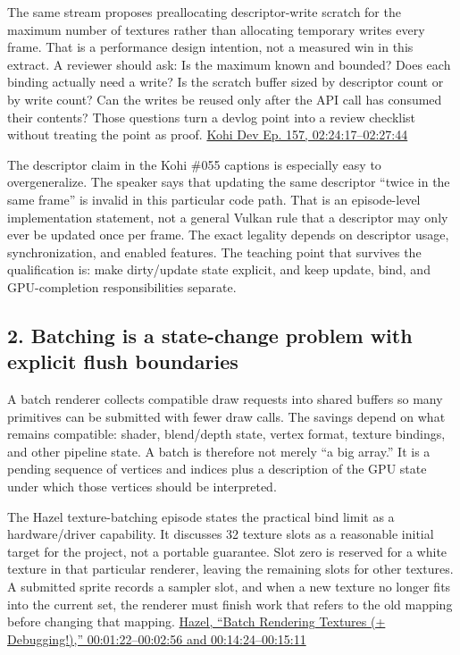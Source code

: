 The same stream proposes preallocating descriptor-write scratch for the maximum number of textures rather than allocating temporary writes every frame. That is a performance design intention, not a measured win in this extract. A reviewer should ask: Is the maximum known and bounded? Does each binding actually need a write? Is the scratch buffer sized by descriptor count or by write count? Can the writes be reused only after the API call has consumed their contents? Those questions turn a devlog point into a review checklist without treating the point as proof. \href{https://www.youtube.com/watch?v=ZmZUmsqUN6Q&t=2h24m17s}{Kohi Dev Ep. 157, 02:24:17--02:27:44}

The descriptor claim in the Kohi \#055 captions is especially easy to overgeneralize. The speaker says that updating the same descriptor ``twice in the same frame'' is invalid in this particular code path. That is an episode-level implementation statement, not a general Vulkan rule that a descriptor may only ever be updated once per frame. The exact legality depends on descriptor usage, synchronization, and enabled features. The teaching point that survives the qualification is: make dirty/update state explicit, and keep update, bind, and GPU-completion responsibilities separate.

\subsection{2. Batching is a state-change problem with explicit flush boundaries}\label{06-engine-ii-ch041-batching-is-a-state-change-problem-with-explicit-flush-boundaries}

\hypertarget{06-engine-ii-ch041-batching-is-a-state-change-problem-with-explicit-flush-boundaries}{}

A batch renderer collects compatible draw requests into shared buffers so many primitives can be submitted with fewer draw calls. The savings depend on what remains compatible: shader, blend/depth state, vertex format, texture bindings, and other pipeline state. A batch is therefore not merely ``a big array.'' It is a pending sequence of vertices and indices plus a description of the GPU state under which those vertices should be interpreted.

The Hazel texture-batching episode states the practical bind limit as a hardware/driver capability. It discusses 32 texture slots as a reasonable initial target for the project, not a portable guarantee. Slot zero is reserved for a white texture in that particular renderer, leaving the remaining slots for other textures. A submitted sprite records a sampler slot, and when a new texture no longer fits into the current set, the renderer must finish work that refers to the old mapping before changing that mapping. \href{https://www.youtube.com/watch?v=Fz1VySWaad8&t=1m22s}{Hazel, ``Batch Rendering Textures (+ Debugging!),'' 00:01:22--00:02:56 and 00:14:24--00:15:11}

